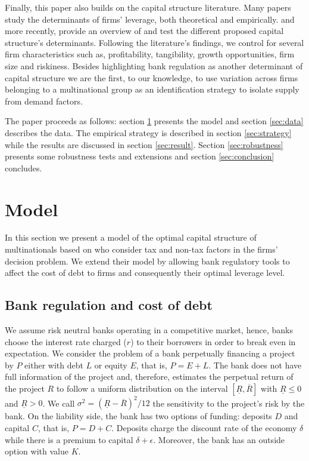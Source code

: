 \documentclass[12pt]{article}
\begin{document}
	Finally, this paper also builds on the capital structure literature. Many papers study the determinants of firms' leverage, both theoretical and empirically. \cite*{titman1988determinants} and more recently, \cite*{oztekin2015capital} provide an overview of and test the different proposed capital structure's determinants. Following the literature's findings, we control for several firm characteristics such as, profitability, tangibility, growth opportunities, firm size and riskiness. Besides highlighting bank regulation as another determinant of capital structure we are the first, to our knowledge, to use variation across firms belonging to a multinational group as an identification strategy to isolate supply from demand factors.          
	
	The paper proceeds as follows: section \ref{sec:model} presents the model and section \ref{sec:data} describes the data. The empirical strategy is described in section \ref{sec:strategy} while the results are discussed in section \ref{sec:result}. Section \ref{sec:robustness} presents some robustness tests and extensions and section \ref{sec:conclusion} concludes. 
	
		\section{Model} \label{sec:model}
	In this section we present a model of the optimal capital structure of multinationals based on \cite{huizinga2008capital} who consider tax and non-tax factors in the firms' decision problem. We extend their model by allowing bank regulatory tools to affect the cost of debt to firms and consequently their optimal leverage level.  
	\subsection{Bank regulation and cost of debt}
	\label{subsec:bank}
	We assume risk neutral banks operating in a competitive market, hence, banks choose the interest rate charged ($r$) to their borrowers in order to break even in expectation. We consider the problem of a bank perpetually financing a project by $P$ either with debt $L$ or equity $E$, that is, $P=E+L$. The bank does not have full information of the project and, therefore, estimates the perpetual return of the project $R$ to follow a uniform distribution on the interval $[\underline{R},\overline{R}]$ with $\underline{R}\leq0$ and $\underline{R}>0$. We call $\sigma^2=(\underline{R}-\overline{R})^2/12$ the sensitivity to the project's risk by the bank. On the liability side, the bank has two options of funding: deposits $D$ and capital $C$, that is, $P=D+C$. Deposits charge the discount rate of the economy $\delta$ while there is a premium to capital $\delta+\epsilon$. Moreover, the bank has an outside option with value $K$.
	
\end{document}
